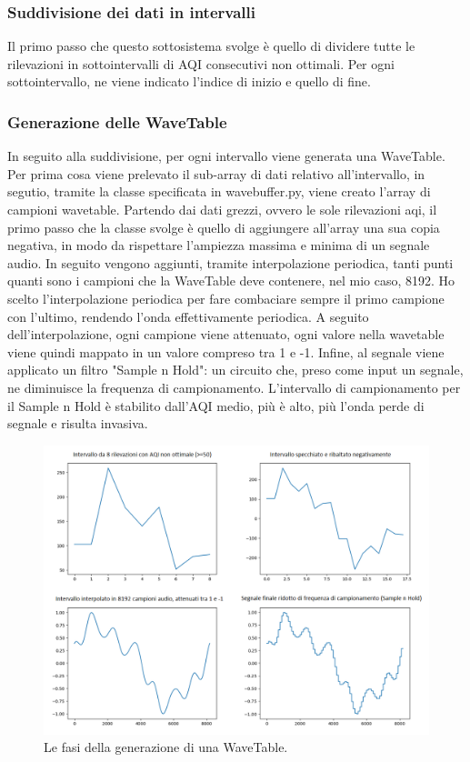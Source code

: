 \subsubsection{Suddivisione dei dati in intervalli}
Il primo passo che questo sottosistema svolge è quello di dividere tutte le rilevazioni in sottointervalli di AQI consecutivi non ottimali.
Per ogni sottointervallo, ne viene indicato l'indice di inizio e quello di fine.
\subsubsection{Generazione delle WaveTable}
In seguito alla suddivisione, per ogni intervallo viene generata una WaveTable.
Per prima cosa viene prelevato il sub-array di dati relativo all'intervallo, in segutio, tramite la classe specificata in wavebuffer.py, viene creato l'array di campioni wavetable.
Partendo dai dati grezzi, ovvero le sole rilevazioni aqi, il primo passo che la classe svolge è quello di aggiungere all'array una sua copia negativa, in modo da rispettare l'ampiezza massima e minima di un segnale audio.
In seguito vengono aggiunti, tramite interpolazione periodica, tanti punti quanti sono i campioni che la WaveTable deve contenere, nel mio caso, 8192.
Ho scelto l'interpolazione periodica per fare combaciare sempre il primo campione con l'ultimo, rendendo l'onda effettivamente periodica.
A seguito dell'interpolazione, ogni campione viene attenuato, ogni valore nella wavetable viene quindi mappato in un valore compreso tra 1 e -1.
Infine, al segnale viene applicato un filtro "Sample n Hold": un circuito che, preso come input un segnale, ne diminuisce la frequenza di campionamento.
L'intervallo di campionamento per il Sample n Hold è stabilito dall'AQI medio, più è alto, più l'onda perde di segnale e risulta invasiva.
\begin{figure}[h]
  \includegraphics[width=\linewidth]{img/waves.png}
  \caption{Le fasi della generazione di una WaveTable.}
  \label{fig:wavetable}
\end{figure}


